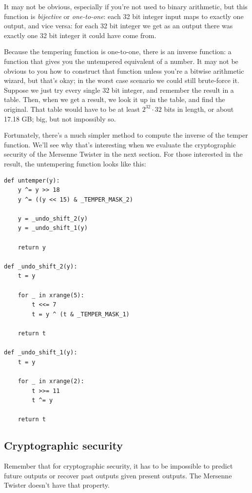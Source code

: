 \documentclass[11pt,ebook,table,dvipsnames]{memoir}
\begin{document}
It may not be obvious, especially if you're not used to binary
arithmetic, but this function is \emph{bijective} or \emph{one-to-one}: each 32
bit integer input maps to exactly one output, and vice versa: for each
32 bit integer we get as an output there was exactly one 32 bit
integer it could have come from.

Because the tempering function is one-to-one, there is an inverse
function: a function that gives you the untempered equivalent of a
number. It may not be obvious to you how to construct that function
unless you're a bitwise arithmetic wizard, but that's okay; in the
worst case scenario we could still brute-force it. Suppose we just try
every single 32 bit integer, and remember the result in a table. Then,
when we get a result, we look it up in the table, and find the
original. That table would have to be at least $2^{32} \cdot 32$ bits
in length, or about 17.18 GB; big, but not impossibly so.

Fortunately, there's a much simpler method to compute the inverse of
the temper function. We'll see why that's interesting when we evaluate
the cryptographic security of the Mersenne Twister in the next
section. For those interested in the result, the untempering function
looks like this:

\begin{verbatim}
def untemper(y):
    y ^= y >> 18
    y ^= ((y << 15) & _TEMPER_MASK_2)

    y = _undo_shift_2(y)
    y = _undo_shift_1(y)

    return y

def _undo_shift_2(y):
    t = y

    for _ in xrange(5):
        t <<= 7
        t = y ^ (t & _TEMPER_MASK_1)

    return t

def _undo_shift_1(y):
    t = y

    for _ in xrange(2):
        t >>= 11
        t ^= y

    return t
\end{verbatim}
\subsection{Cryptographic security}
\label{sec-2-10-6-5}

Remember that for cryptographic security, it has to be impossible to
predict future outputs or recover past outputs given present outputs.
The Mersenne Twister doesn't have that property.
\end{document}
